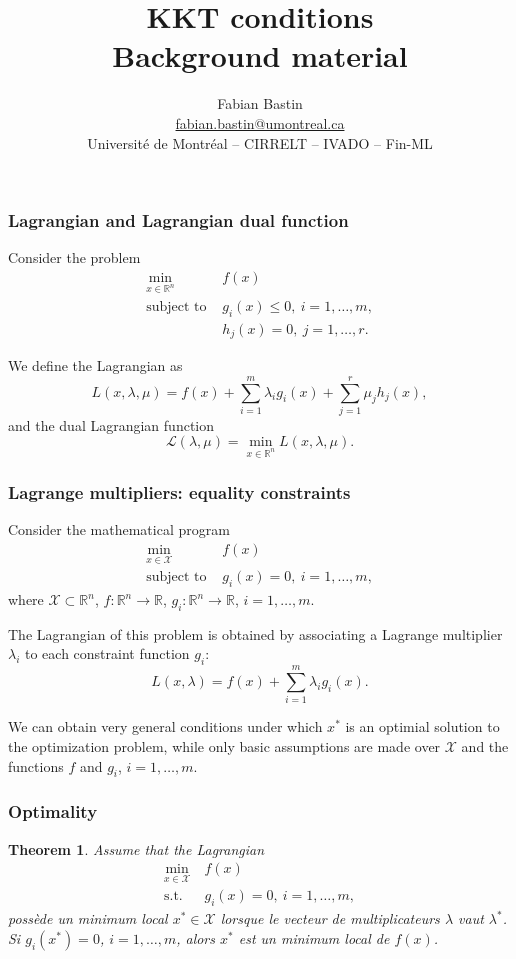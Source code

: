 \documentclass[usepdftitle=false]{beamer}
\author[Fabian Bastin]{Fabian Bastin \\ \url{fabian.bastin@umontreal.ca} \\ Université de Montréal -- CIRRELT -- IVADO -- Fin-ML}
\date{}
\title[Linear programming]{KKT conditions\\Background material}
\newtheorem{thm}{Theorem}
\def\red{\color{red}}
\def\cL{\mathcal{L}}
\def\cX{\mathcal{X}}
\def\RR{\mathbb{R}}
\begin{document}
\frame{\titlepage}


\begin{frame}
	\frametitle{Lagrangian and Lagrangian dual function}
	
Consider the problem
	\begin{align*}
		\min_{x \in \mathbb{R}^n} \ & f(x) \\
		\mbox{subject to } & g_i(x) \leq 0,\ i = 1,\ldots,m, \\
		& h_j(x) = 0,\ j = 1,\ldots,r.
	\end{align*}

We define the Lagrangian as
	$$
	L(x, \lambda, \mu) = f(x) + \sum_{i = 1}^m \lambda_i g_i(x)
	+ \sum_{j = 1}^r \mu_j h_j(x),
	$$
and the dual Lagrangian function
	$$
	\cL(\lambda, \mu) = \min_{x \in \mathbb{R}^n} L(x, \lambda, \mu).
	$$
	
\end{frame}

\begin{frame}
\frametitle{Lagrange multipliers: equality constraints}

Consider the mathematical program
\begin{align*}
\min_{x \in \cX} \ & f(x) \\
\mbox{subject to } & g_i(x) = 0,\ i = 1,\ldots,m,
\end{align*}
where $\cX \subset \RR^n$, $f: \RR^n \rightarrow \RR$, $g_i: \RR^n \rightarrow \RR$, $i = 1,\ldots,m$.

\mbox{}

The {\red Lagrangian} of this problem is obtained by associating a Lagrange multiplier  $\lambda_i$ to each constraint function $g_i$:
$$
L(x, \lambda) = f(x) + \sum_{i = 1}^{m} \lambda_i g_i(x).
$$

We can obtain very general conditions under which $x^*$ is an optimial solution to the optimization problem, while only basic assumptions are made over $\cX$ and the functions $f$ and $g_i$, $i = 1,\ldots,m$.

\end{frame}

\begin{frame}
\frametitle{Optimality}

\begin{thm}
Assume that the Lagrangian
\begin{align*}
\min_{x \in \cX} \ & f(x) \\
\mbox{s.t. } & g_i(x) = 0,\ i = 1,\ldots,m,
\end{align*}
possède un minimum local $x^* \in \cX$ lorsque le vecteur de multiplicateurs $\lambda$ vaut $\lambda^*$.
Si $g_i(x^*) = 0$, $i = 1,\ldots,m$, alors $x^*$ est un minimum local de $f(x)$.
\end{thm}

\end{frame}
\end{document}
